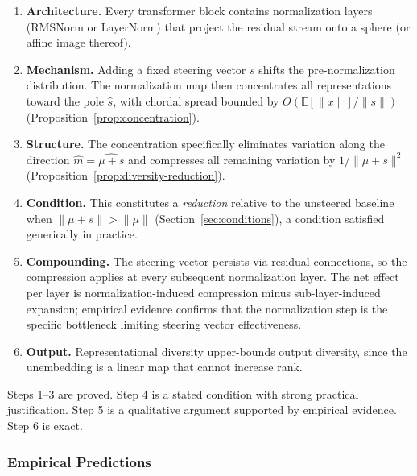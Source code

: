 \begin{enumerate}
  \item \textbf{Architecture.}
    Every transformer block contains normalization layers (RMSNorm or
    LayerNorm) that project the residual stream onto a sphere (or
    affine image thereof).

  \item \textbf{Mechanism.}
    Adding a fixed steering vector $s$ shifts the pre-normalization
    distribution.
    The normalization map then concentrates all representations toward
    the pole $\hat{s}$, with chordal spread bounded by
    $O(\mathbb{E}[\|x\|] / \|s\|)$
    (Proposition~\ref{prop:concentration}).

  \item \textbf{Structure.}
    The concentration specifically eliminates variation along the
    direction $\hat{m} = \widehat{\mu + s}$ and compresses all
    remaining variation by $1/\|\mu + s\|^2$
    (Proposition~\ref{prop:diversity-reduction}).

  \item \textbf{Condition.}
    This constitutes a \emph{reduction} relative to the unsteered
    baseline when $\|\mu + s\| > \|\mu\|$
    (Section~\ref{sec:conditions}), a condition satisfied generically
    in practice.

  \item \textbf{Compounding.}
    The steering vector persists via residual connections, so the
    compression applies at every subsequent normalization layer.
    The net effect per layer is normalization-induced compression
    minus sub-layer-induced expansion; empirical evidence
    \citep{sinii2025small} confirms that the normalization step is the
    specific bottleneck limiting steering vector effectiveness.

  \item \textbf{Output.}
    Representational diversity upper-bounds output diversity, since the
    unembedding is a linear map that cannot increase rank.
\end{enumerate}

\noindent
Steps 1--3 are proved.
Step 4 is a stated condition with strong practical justification.
Step 5 is a qualitative argument supported by empirical evidence.
Step 6 is exact.

\subsubsection{Empirical Predictions}

